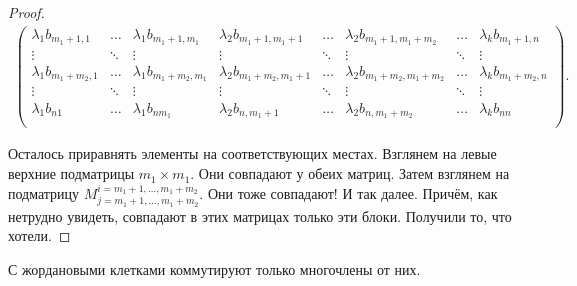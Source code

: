 \begin{proof}
\begin{multline*}
\begin{pmatrix}
            \lambda_1b_{m_1 + 1, 1} & \ldots & \lambda_1b_{m_1 + 1, m_1} & \lambda_2b_{m_1 + 1, m_1 + 1} & \ldots & \lambda_2b_{m_1 + 1, m_1 + m_2} & \ldots & \lambda_kb_{m_1 + 1, n}\\
            \vdots & \ddots & \vdots & \vdots & \ddots & \vdots & \ddots & \vdots\\
            \lambda_1b_{m_1 + m_2, 1} & \ldots & \lambda_1b_{m_1 + m_2, m_1} & \lambda_2b_{m_1 + m_2, m_1 + 1} & \ldots & \lambda_2b_{m_1 + m_2, m_1 + m_2} & \ldots & \lambda_kb_{m_1 + m_2, n}\\
            \vdots & \ddots & \vdots & \vdots & \ddots & \vdots & \ddots & \vdots\\
            \lambda_1b_{n1} & \ldots & \lambda_1b_{nm_1} & \lambda_2b_{n, m_1 + 1} & \ldots & \lambda_2b_{n, m_1 + m_2} & \ldots & \lambda_kb_{nn}\\
        \end{pmatrix}.
    \end{multline*}

    Осталось приравнять элементы на соответствующих местах. Взглянем на левые верхние подматрицы $m_1 \times m_1$. Они совпадают у обеих матриц. Затем взглянем на подматрицу $M^{i = m_1 + 1, \ldots, m_1 + m_2}_{j = m_1 + 1, \ldots, m_1 + m_2}$. Они тоже совпадают! И так далее. Причём, как нетрудно увидеть, совпадают в этих матрицах только эти блоки. Получили то, что хотели.
\end{proof}

\begin{lemma}
    С жордановыми клетками коммутируют только многочлены от них\footnotemark.
\end{lemma}


